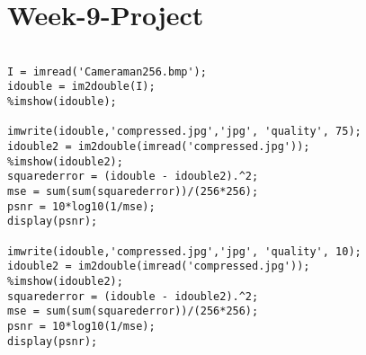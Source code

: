 \documentclass[12 pt]{article}
\begin{document}
 \newpage
 \section{Week-9-Project}
 
 
\begin{lstlisting}
 
I = imread('Cameraman256.bmp');
idouble = im2double(I);
%imshow(idouble);

imwrite(idouble,'compressed.jpg','jpg', 'quality', 75);
idouble2 = im2double(imread('compressed.jpg'));
%imshow(idouble2);
squarederror = (idouble - idouble2).^2;
mse = sum(sum(squarederror))/(256*256);
psnr = 10*log10(1/mse);
display(psnr);

imwrite(idouble,'compressed.jpg','jpg', 'quality', 10);
idouble2 = im2double(imread('compressed.jpg'));
%imshow(idouble2);
squarederror = (idouble - idouble2).^2;
mse = sum(sum(squarederror))/(256*256);
psnr = 10*log10(1/mse);
display(psnr);

 \end{lstlisting}
 




\end{document}
